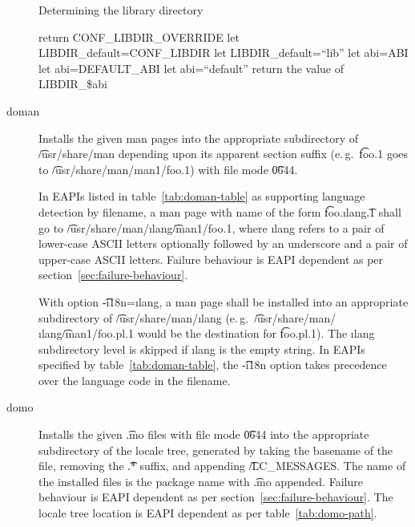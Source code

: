 \begin{description}
\begin{algorithm}
\caption{Determining the library directory} \label{alg:ebuild-libdir}
\begin{algorithmic}[1]
    \STATE return CONF_LIBDIR_OVERRIDE
\ENDIF
{}
    \STATE let LIBDIR_default=CONF_LIBDIR
\ELSE
    \STATE let LIBDIR_default=``lib''
\ENDIF
{}
    \STATE let abi=ABI
    \STATE let abi=DEFAULT_ABI
\ELSE
    \STATE let abi=``default''
\ENDIF
\STATE return the value of LIBDIR_\$abi
\end{algorithmic}
\end{algorithm}

\item[doman] Installs the given man pages into the appropriate subdirectory of \t{/usr/share/man}
    depending upon its apparent section suffix (e.\,g.\ \t{foo.1} goes to
    \t{/usr/share/man/man1/foo.1}) with file mode \t{0644}.

     In EAPIs listed in table~\ref{tab:doman-table} as supporting
    language detection by filename, a man page with name of the form \t{foo.}\i{lang}\t{.1} shall
    go to \t{/usr/share/man/}\i{lang}\t{/man1/foo.1}, where \i{lang} refers to a pair of lower-case
    ASCII letters optionally followed by an underscore and a pair of upper-case ASCII letters.
    Failure behaviour is EAPI dependent as per section~\ref{sec:failure-behaviour}.

    With option \t{-i18n=}\i{lang}, a man page shall be installed into an appropriate subdirectory
    of \t{/usr/share/man/}\i{lang} (e.\,g.\ \t{/usr/share/man/}\i{lang}\t{/man1/foo.pl.1} would be
    the destination for \t{foo.pl.1}). The \i{lang} subdirectory level is skipped if \i{lang} is
    the empty string. In EAPIs specified by table~\ref{tab:doman-table}, the \t{-i18n} option takes
    precedence over the language code in the filename.

\item[domo]  Installs the given \t{.mo} files with file mode \t{0644} into
    the appropriate subdirectory of the locale tree, generated by taking the basename of the file,
    removing the \t{.*} suffix, and appending \t{/LC_MESSAGES}\@. The name of the installed files
    is the package name with \t{.mo} appended. Failure behaviour is EAPI dependent as per
    section~\ref{sec:failure-behaviour}. The locale tree location is EAPI dependent as per
    table~\ref{tab:domo-path}.


\end{description}
